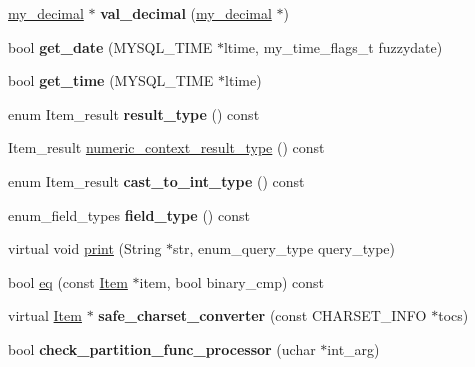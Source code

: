 \begin{DoxyCompactItemize}
\mbox{\label{classItem__hex__string_a984e88cc78af439fd2fe74ee60aa0005}} 
\mbox{\hyperlink{classmy__decimal}{my\+\_\+decimal}} $\ast$ {\bfseries val\+\_\+decimal} (\mbox{\hyperlink{classmy__decimal}{my\+\_\+decimal}} $\ast$)
\item 
\mbox{\label{classItem__hex__string_adc57694579a830e9c50abc52d1373ea1}} 
bool {\bfseries get\+\_\+date} (M\+Y\+S\+Q\+L\+\_\+\+T\+I\+ME $\ast$ltime, my\+\_\+time\+\_\+flags\+\_\+t fuzzydate)
\item 
\mbox{\label{classItem__hex__string_a9248c27b5ce9a357e9cf7ca5a5f14e0c}} 
bool {\bfseries get\+\_\+time} (M\+Y\+S\+Q\+L\+\_\+\+T\+I\+ME $\ast$ltime)
\item 
\mbox{\label{classItem__hex__string_a57abc39889634f9b216fd0561408a236}} 
enum Item\+\_\+result {\bfseries result\+\_\+type} () const
\item 
Item\+\_\+result \mbox{\hyperlink{classItem__hex__string_af866816dabea5ef3d8316a2055ebab84}{numeric\+\_\+context\+\_\+result\+\_\+type}} () const
\item 
\mbox{\label{classItem__hex__string_a1d725e5ce8f3bd5bc91854142918fcc7}} 
enum Item\+\_\+result {\bfseries cast\+\_\+to\+\_\+int\+\_\+type} () const
\item 
\mbox{\label{classItem__hex__string_a462c93955c9783cc6367dbbd701879d4}} 
enum\+\_\+field\+\_\+types {\bfseries field\+\_\+type} () const
\item 
virtual void \mbox{\hyperlink{classItem__hex__string_acb5db1d4b87cf94b16c0878d2a24616a}{print}} (String $\ast$str, enum\+\_\+query\+\_\+type query\+\_\+type)
\item 
bool \mbox{\hyperlink{classItem__hex__string_abbed37919e6473f66b9814d612ece365}{eq}} (const \mbox{\hyperlink{classItem}{Item}} $\ast$item, bool binary\+\_\+cmp) const
\item 
\mbox{\label{classItem__hex__string_a9536653d66522094d3c788f1525abc65}} 
virtual \mbox{\hyperlink{classItem}{Item}} $\ast$ {\bfseries safe\+\_\+charset\+\_\+converter} (const C\+H\+A\+R\+S\+E\+T\+\_\+\+I\+N\+FO $\ast$tocs)
\item 
\mbox{\label{classItem__hex__string_a994e09f6a28ab9aa5a980bd2fd37106c}} 
bool {\bfseries check\+\_\+partition\+\_\+func\+\_\+processor} (uchar $\ast$int\+\_\+arg)
\end{DoxyCompactItemize}
